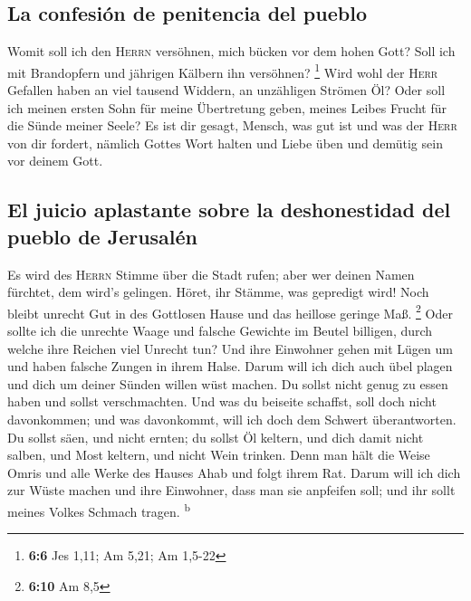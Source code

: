 \hypertarget{la-confesiuxf3n-de-penitencia-del-pueblo}{%
\subsection{La confesión de penitencia del
pueblo}\label{la-confesiuxf3n-de-penitencia-del-pueblo}}

 Womit soll ich den \textsc{Herrn} versöhnen, mich bücken
vor dem hohen Gott? Soll ich mit Brandopfern und jährigen Kälbern ihn
versöhnen? \footnote{\textbf{6:6} Jes 1,11; Am 5,21; Am 1,5-22}
 Wird wohl der \textsc{Herr} Gefallen haben an viel
tausend Widdern, an unzähligen Strömen Öl? Oder soll ich meinen ersten
Sohn für meine Übertretung geben, meines Leibes Frucht für die Sünde
meiner Seele?  Es ist dir gesagt, Mensch, was gut ist und
was der \textsc{Herr} von dir fordert, nämlich Gottes Wort halten und
Liebe üben und demütig sein vor deinem Gott.

\hypertarget{el-juicio-aplastante-sobre-la-deshonestidad-del-pueblo-de-jerusaluxe9n}{%
\subsection{El juicio aplastante sobre la deshonestidad del pueblo de
Jerusalén}\label{el-juicio-aplastante-sobre-la-deshonestidad-del-pueblo-de-jerusaluxe9n}}

 Es wird des \textsc{Herrn} Stimme über die Stadt rufen;
aber wer deinen Namen fürchtet, dem wird's gelingen. Höret, ihr Stämme,
was gepredigt wird!  Noch bleibt unrecht Gut in des
Gottlosen Hause und das heillose geringe Maß. \footnote{\textbf{6:10} Am
  8,5}  Oder sollte ich die unrechte Waage und falsche
Gewichte im Beutel billigen,  durch welche ihre Reichen
viel Unrecht tun? Und ihre Einwohner gehen mit Lügen um und haben
falsche Zungen in ihrem Halse.  Darum will ich dich auch
übel plagen und dich um deiner Sünden willen wüst machen.
 Du sollst nicht genug zu essen haben und sollst
verschmachten. Und was du beiseite schaffst, soll doch nicht
davonkommen; und was davonkommt, will ich doch dem Schwert
überantworten.  Du sollst säen, und nicht ernten; du
sollst Öl keltern, und dich damit nicht salben, und Most keltern, und
nicht Wein trinken.  Denn man hält die Weise Omris und
alle Werke des Hauses Ahab und folgt ihrem Rat. Darum will ich dich zur
Wüste machen und ihre Einwohner, dass man sie anpfeifen soll; und ihr
sollt meines Volkes Schmach tragen. \textsuperscript{b}

